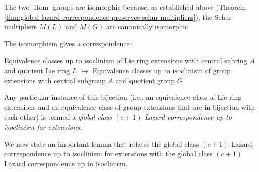 \documentclass{ucetd}
\begin{document}
The two $\operatorname{Hom}$ groups are isomorphic because, as
established above (Theorem
\ref{thm:global-lazard-correspondence-preserves-schur-multipliers}),
the Schur multipliers $M(L)$ and $M(G)$ are canonically isomorphic.

The isomorphism gives a correspondence:

\begin{center}
  Equivalence classes up to isoclinism of Lie ring extensions with
  central subring $A$ and quotient Lie ring $L$ $\leftrightarrow$
  Equivalence classes up to isoclinism of group extensions with central
  subgroup $A$ and quotient group $G$
\end{center}

Any particular instance of this bijection (i.e., an equivalence class
of Lie ring extensions and an equivalence class of group extensions
that are in bijection with each other) is termed a {\em global class
  $(c + 1)$ Lazard correspondence up to isoclinism for extensions}.

We now state an important lemma that relates the global class $(c + 1)$
Lazard correspondence up to isoclinism for extensions with the global
class $(c + 1)$ Lazard correspondence up to isoclinism.







\end{document}
